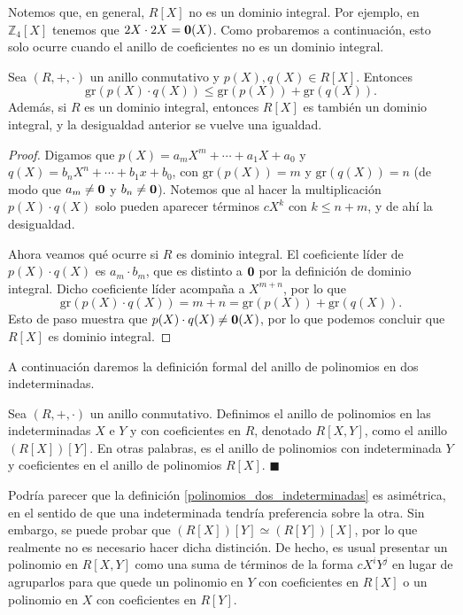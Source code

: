 Notemos que, en general, $R[X]$ no es un dominio integral. Por ejemplo, en $\mathbb{Z}_4[X]$ tenemos que $2X \cdot 2X = \mathbf{0}(X)$. Como probaremos a continuación, esto solo ocurre cuando el anillo de coeficientes no es un dominio integral.

\begin{proposition} \label{grado_producto}
Sea $(R, +, \cdot)$ un anillo conmutativo y $p(X), q(X) \in R[X]$. Entonces
$$\mathrm{gr}(p(X) \cdot q(X)) \leq \mathrm{gr}(p(X)) + \mathrm{gr}(q(X)).$$
Además, si $R$ es un dominio integral, entonces $R[X]$ es también un dominio integral, y la desigualdad anterior se vuelve una igualdad.
\end{proposition}

\begin{proof}
Digamos que $p(X) = a_mX^m + \cdots + a_1X + a_0$ y $q(X) = b_nX^n + \cdots + b_1x+b_0$, con $\mathrm{gr}(p(X)) = m$ y $\mathrm{gr}(q(X)) = n$ (de modo que $a_m \neq \mathbf{0}$ y $b_n \neq \mathbf{0}$). Notemos que al hacer la multiplicación $p(X) \cdot q(X)$ solo pueden aparecer términos $c X^k$ con $k \leq n + m$, y de ahí la desigualdad.

Ahora veamos qué ocurre si $R$ es dominio integral. El coeficiente líder de $p(X) \cdot q(X)$ es $a_m \cdot b_m$, que es distinto a $\mathbf{0}$ por la definición de dominio integral. Dicho coeficiente líder acompaña a $X^{m+n}$, por lo que 
$$\mathrm{gr}(p(X) \cdot q(X)) = m + n = \mathrm{gr}(p(X)) + \mathrm{gr}(q(X)).$$
Esto de paso muestra que $p(X) \cdot q(X) \neq \mathbf{0}(X)$, por lo que podemos concluir que $R[X]$ es dominio integral.
\end{proof}

A continuación daremos la definición formal del anillo de polinomios en dos indeterminadas.

\begin{definition} \label{polinomios_dos_indeterminadas}
Sea $(R, +, \cdot)$ un anillo conmutativo. Definimos el anillo de polinomios en las indeterminadas $X$ e $Y$ y con coeficientes en $R$, denotado $R[X, Y]$, como el anillo $(R[X])[Y]$. En otras palabras, es el anillo de polinomios con indeterminada $Y$ y coeficientes en el anillo de polinomios $R[X]$.
\hfill$\blacksquare$
\end{definition}

Podría parecer que la definición \ref{polinomios_dos_indeterminadas} es asimétrica, en el sentido de que una indeterminada tendría preferencia sobre la otra. Sin embargo, se puede probar que $(R[X])[Y] \simeq (R[Y])[X]$, por lo que realmente no es necesario hacer dicha distinción. De hecho, es usual presentar un polinomio en $R[X,Y]$ como una suma de términos de la forma $c X^i Y^j$ en lugar de agruparlos para que quede un polinomio en $Y$ con coeficientes en $R[X]$ o un polinomio en $X$ con coeficientes en $R[Y]$. 

